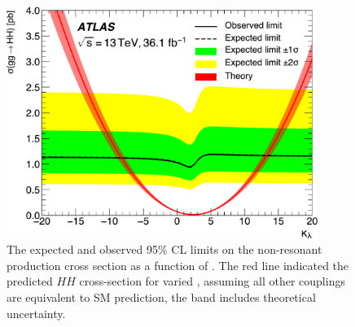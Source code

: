 \begin{figure}[!htbp]
  \centering
\includegraphics[width=0.9\textwidth]{chapters/chapter5_yybb/images/limits/lambda.pdf}
\caption[The expected and observed limits on the non-resonant \HH production cross section as a function of \klambda]
{The expected and observed 95\% \gls{CL} limits on the non-resonant \HH production cross section as a function of \klambda. The red line indicated the predicted $HH$ cross-section for varied \klambda, assuming all other couplings are equivalent to \gls{SM} prediction, the band includes theoretical uncertainty.} 
\label{fig:limits-klambda}
\end{figure}